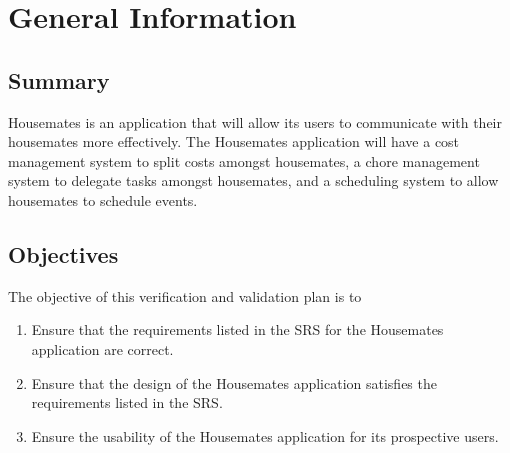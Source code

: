 \documentclass[12pt, titlepage]{article}
\begin{document}



\newpage



\section{General Information}

\subsection{Summary}

 Housemates is an application that will allow its users to communicate with their housemates more effectively. The Housemates application will have a cost management system to split costs amongst housemates, a chore management system to delegate tasks amongst housemates, and a scheduling system to allow housemates to schedule events.


\subsection{Objectives}

The objective of this verification and validation plan is to
\begin{enumerate}
    \item Ensure that the requirements listed in the SRS for the Housemates application are correct.
    \item Ensure that the design of the Housemates application satisfies the requirements listed in the SRS.
    \item Ensure the usability of the Housemates application for its prospective users.
\end{enumerate}
\end{document}
